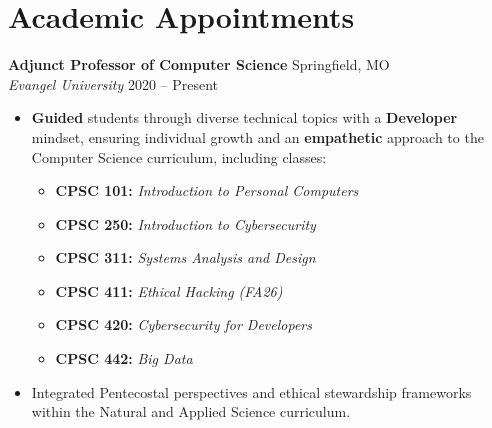 \documentclass[11pt,letterpaper]{article}
\newcommand{\cvitem}[4]{
    \noindent\textbf{#1} \hfill #2 \\
    \textit{#3} \hfill #4 \par
    \vspace{6pt}
}
\begin{document}
\section{Academic Appointments}
\cvitem{Adjunct Professor of Computer Science}{Springfield, MO}{Evangel University}{2020  --  Present}{
  \begin{itemize}[noitemsep, topsep=0pt]
    \item \textbf{Guided} students through diverse technical topics with a \textbf{Developer} mindset, ensuring individual growth and an \textbf{empathetic} approach to the Computer Science curriculum, including classes:
    \begin{itemize}[noitemsep, label=$\circ$]
        \item \textbf{CPSC 101:} \textit{Introduction to Personal Computers}
        \item \textbf{CPSC 250:} \textit{Introduction to Cybersecurity}
        \item \textbf{CPSC 311:} \textit{Systems Analysis and Design}
        \item \textbf{CPSC 411:} \textit{Ethical Hacking (FA26)}
        \item \textbf{CPSC 420:} \textit{Cybersecurity for Developers}
        \item \textbf{CPSC 442:} \textit{Big Data}
    \end{itemize}
    \item Integrated Pentecostal perspectives and ethical stewardship frameworks within the Natural and Applied Science curriculum.
  \end{itemize}
}

\end{document}
